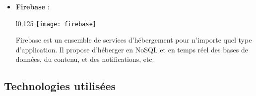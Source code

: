 \begin{itemize}
    \item \textbf{Firebase} :\\
    \begin{minipage}{\linewidth}
      \begin{wrapfigure}{l}{0.125\textwidth}
        \vspace{-0.5cm}
        \texttt{[image: firebase]} 
      \end{wrapfigure}
      Firebase est un ensemble de services d'hébergement pour n'importe quel type d'application.
      Il propose d'héberger en NoSQL et en temps réel des bases de données, du contenu, et des notifications, etc.
    \end{minipage}
  \end{itemize}


  \subsection{Technologies utilisées}

